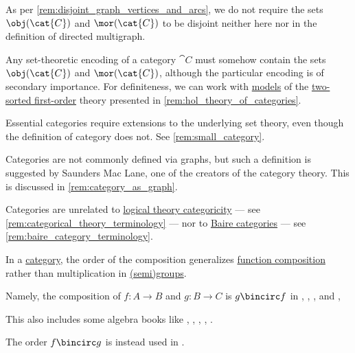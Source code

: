 \begin{comments}
  \item As per \cref{rem:disjoint_graph_vertices_and_arcs}, we do not require the sets \( \obj(\cat{C}) \) and \( \mor(\cat{C}) \) to be disjoint neither here nor in the definition of directed multigraph.

  \item Any set-theoretic encoding of a category \( \cat{C} \) must somehow contain the sets \( \obj(\cat{C}) \) and \( \mor(\cat{C}) \), although the particular encoding is of secondary importance. For definiteness, we can work with \hyperref[def:hol_semantics/model]{models} of the \hyperref[def:many_sorted_fol]{two-sorted first-order} theory presented in \cref{rem:hol_theory_of_categories}.

  \item Essential categories require extensions to the underlying set theory, even though the definition of category does not. See \cref{rem:small_category}.

  \item Categories are not commonly defined via graphs, but such a definition is suggested by Saunders Mac Lane, one of the creators of the category theory. This is discussed in \cref{rem:category_as_graph}.

  \item Categories are unrelated to \hyperref[def:categorical_logical_theory]{logical theory categoricity} --- see \cref{rem:categorical_theory_terminology} --- nor to \hyperref[def:meager_set]{Baire categories} --- see \cref{rem:baire_category_terminology}.
\end{comments}

\begin{remark}\label{rem:category_composition_order}
  In a \hyperref[def:category]{category}, the order of the composition generalizes \hyperref[def:set_valued_function/composition]{function composition} rather than multiplication in \hyperref[def:group]{(semi)groups}.

  \begin{thmenum}
     Namely, the composition of \( f: A \to B \) and \( g: B \to C \) is \( g \bincirc f \) in
    \cite[7]{MacLane1998CategoryTheory}
    \cite[def. 1.1.1]{Schubert1972Categories}
    \cite[def. 1.1]{Awodey2010CategoryTheory},
    \cite[def. 1.1.1]{Perrone2024StartingCategoryTheory},
    \cite[def. 1.1.1]{Riehl2016CategoryTheory},
    \cite[def. 1.1.1]{Leinster2014BasicCategoryTheory} and
    \cite[def. 3.1]{AdámekHerrlichStrecker2004JoyOfCats},

    This also includes some algebra books like
    \cite[def. I.3.1]{Aluffi2009Algebra},
    \cite[53]{Lang2002Algebra},
    \cite[689]{Eisenbud1995CommutativeAlgebra},
    \cite[def. 1.1]{Jacobson1989BasicAlgebraII},
    \cite[268]{Шафаревич2019ОсновныеПонятияАлгебры}.

     The order \( f \bincirc g \) is instead used in
    \cite[def. I.1.1]{ЦаленкоШульгейфер1974ОсновыТеорииКатегорий}.
  \end{thmenum}
\end{remark}

